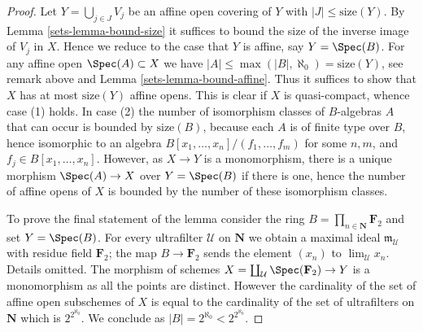 \begin{proof}

Let $Y = \bigcup_{j \in J} V_j$ be an affine open covering of $Y$
with $|J| \leq \text{size}(Y)$. By Lemma \ref{sets-lemma-bound-size}
it suffices to bound the size of the inverse image of $V_j$ in $X$.
Hence we reduce to the case that $Y$ is affine, say $Y = \Spec(B)$.
For any affine open $\Spec(A) \subset X$ we have
$|A| \leq \max(|B|, \aleph_0) = \text{size}(Y)$, see remark above
and Lemma \ref{sets-lemma-bound-affine}. Thus it suffices to show
that $X$ has at most $\text{size}(Y)$ affine opens. This is clear
if $X$ is quasi-compact, whence case (1) holds.
In case (2) the number of isomorphism classes of $B$-algebras $A$
that can occur is bounded by $\text{size}(B)$, because each
$A$ is of finite type over $B$, hence isomorphic to an algebra
$B[x_1, \ldots, x_n]/(f_1, \ldots, f_m)$
for some $n, m$, and $f_j \in B[x_1, \ldots, x_n]$. However, as
$X \to Y$ is a monomorphism, there is a unique morphism
$\Spec(A) \to X$ over $Y = \Spec(B)$ if there is one,
hence the number of affine
opens of $X$ is bounded by the number of these isomorphism classes.

\medskip\noindent
To prove the final statement of the lemma consider the ring
$B = \prod_{n \in \mathbf{N}} \mathbf{F}_2$ and set $Y = \Spec(B)$.
For every ultrafilter $\mathcal{U}$ on $\mathbf{N}$ we obtain a maximal
ideal $\mathfrak m_\mathcal{U}$ with residue field $\mathbf{F}_2$;
the map $B \to \mathbf{F}_2$ sends the element $(x_n)$ to
$\lim_\mathcal{U} x_n$. Details omitted.
The morphism of schemes $X = \coprod_\mathcal{U} \Spec(\mathbf{F}_2) \to Y$
is a monomorphism as all the points are distinct. However the cardinality
of the set of affine open subschemes of $X$ is equal to the cardinality
of the set of ultrafilters on $\mathbf{N}$ which is
$2^{2^{\aleph_0}}$. We conclude as $|B| = 2^{\aleph_0} < 2^{2^{\aleph_0}}$.
\end{proof}

